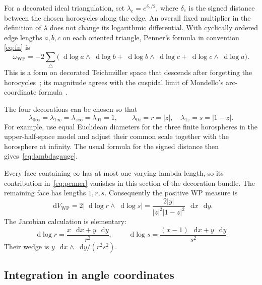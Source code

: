 \documentclass[11pt,a4paper]{article}
\numberwithin{equation}{section}
\theoremstyle{definition}
\theoremstyle{remark}
\newcommand{\dd}{\mathop{}\!\mathrm d}
\newcommand{\WP}{\mathrm{WP}}
\newcommand{\dV}{\dd V_{\WP}}
\newcommand{\abs}[1]{\left|#1\right|}
\begin{document}
For a decorated ideal triangulation, set $\lambda_e=e^{\delta_e/2}$, where
$\delta_e$ is the signed distance between the chosen horocycles along the
edge. An overall fixed multiplier in the definition of $\lambda$ does not
change its logarithmic differential. With cyclically ordered edge lengths
$a,b,c$ on each oriented triangle, Penner's formula in convention
\eqref{eq:fn} is
\begin{equation}
 \omega_{\WP}=-2\sum_{\triangle}
 \bigl(\dd\log a\wedge\dd\log b+
       \dd\log b\wedge\dd\log c+
       \dd\log c\wedge\dd\log a\bigr).
 \label{eq:penner}
\end{equation}
This is a form on decorated Teichm\"uller space that descends after forgetting
the horocycles~\cite{Penner}; its magnitude agrees with the cuspidal limit
of Mondello's arc-coordinate formula~\cite{MondelloBoundary}.

The four decorations can be chosen so that
\begin{equation}
 \lambda_{0\infty}=\lambda_{1\infty}=\lambda_{z\infty}
 =\lambda_{01}=1,
 \qquad \lambda_{0z}=r=|z|,\quad\lambda_{1z}=s=|1-z|.
 \label{eq:lambdagauge}
\end{equation}
For example, use equal Euclidean diameters for the three finite horospheres
in the upper-half-space model and adjust their common scale together with
the horosphere at infinity. The usual formula for the signed distance then
gives~\eqref{eq:lambdagauge}.

Every face containing $\infty$ has at most one varying lambda length, so its
contribution in~\eqref{eq:penner} vanishes in this section of the decoration
bundle. The remaining face has lengths $1,r,s$. Consequently the positive
WP measure is
\begin{equation}
 \boxed{
 \dV=2\abs{\dd\log r\wedge\dd\log s}
      =\frac{2|y|}{|z|^2|1-z|^2}\,\dd x\,\dd y.}
 \label{eq:tetdensity}
\end{equation}
The Jacobian calculation is elementary:
\[
 \dd\log r=\frac{x\,\dd x+y\,\dd y}{r^2},\qquad
 \dd\log s=\frac{(x-1)\,\dd x+y\,\dd y}{s^2}.
\]
Their wedge is $y\,\dd x\wedge\dd y/(r^2s^2)$.

\subsection{Integration in angle coordinates}
\end{document}
